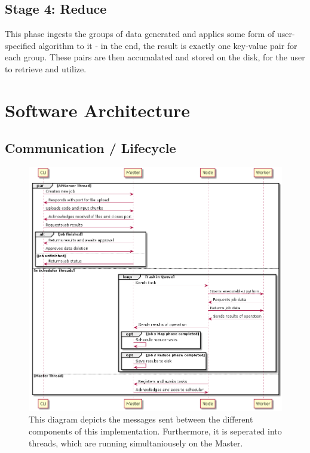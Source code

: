 \documentclass[a4paper]{article}
\begin{document}
\hypertarget{stage-4-reduce}{%
\subsection{Stage 4: Reduce}\label{stage-4-reduce}}

This phase ingests the groups of data generated and applies some form of user-specified algorithm to it - in the end, the result is exactly one key-value pair for each group. These pairs are then accumalated and stored on the disk, for the user to retrieve and utilize.

\hypertarget{software-architecture}{%
\section{Software Architecture}\label{software-architecture}}

\hypertarget{communication-lifecycle}{%
\subsection{Communication / Lifecycle}\label{communication-lifecycle}}

\begin{figure}
\centering
\includegraphics[width=\linewidth]{images/sequence_diagram}
\caption{This diagram depicts the messages sent between the different components of this implementation. Furthermore, it is seperated into threads, which are running simultaniousely on the Master.}
\end{figure}
\end{document}
